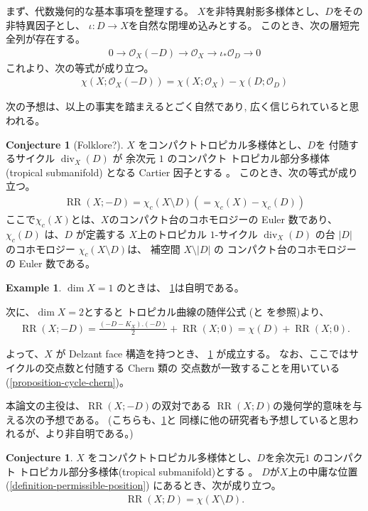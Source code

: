 \documentclass[a4paper,dvipdfmx,reqno,12pt]{amsart}
\theoremstyle{definition}
\newtheorem{example}[theorem]{Example}
\newtheorem{conjecture}[theorem]{Conjecture}
\newcommand{\opn}[1]{\operatorname{#1}}
\numberwithin{equation}{section}
\begin{document}
まず、代数幾何的な基本事項を整理する。
$X$を非特異射影多様体とし、$D$をその非特異因子とし、
$\iota\colon D\to X$を自然な閉埋め込みとする。
このとき、次の層短完全列が存在する。
\begin{align}
     0\to \mathcal{O}_X(-D)\to 
\mathcal{O}_X\to \iota_*\mathcal{O}_D\to 0
\end{align}
これより、次の等式が成り立つ。
\begin{align}
\label{equation-anti-effective-divisor}
\chi(X;\mathcal{O}_X(-D))=\chi(X;\mathcal{O}_X)
-\chi(D;\mathcal{O}_D)
\end{align}

次の予想は、以上の事実を踏まえるとごく自然であり,
広く信じられていると思われる。

\begin{conjecture}[{Folklore?}]
\label{conjecture-rr-c-euler}
$X$ をコンパクトトロピカル多様体とし、$D$を
付随するサイクル $\opn{div}_X(D)$ が
余次元 $1$
のコンパクト
トロピカル部分多様体(tropical submanifold)
となる Cartier 因子とする
\cite[Definition 2.14]{demedrano2023chern}。
このとき、次の等式が成り立つ。
\begin{align}
\opn{RR}(X;-D)=
\chi_c (X\setminus D) (=\chi_c (X)-\chi_c(D))
\end{align}
ここで$\chi_c(X)$とは、$X$のコンパクト台のコホモロジーの
Euler 数であり、
$\chi_c(D)$ は、$D$ が定義する
$X$上のトロピカル $1$-サイクル $\opn{div}_X(D)$
の台 $|D|$ のコホモロジー
$\chi_c(X\setminus D)$は、
補空間 $X\setminus |D|$ の コンパクト台のコホモロジーの
Euler 数である。
\end{conjecture}

\begin{example}
$\dim X=1$ のときは、
\cref{conjecture-rr-c-euler}は自明である。

次に、$\dim X=2$とすると
トロピカル曲線の随伴公式
(\cite[Theorem 6]{shaw2015tropical}と
\cite[Theorem 5.2]{demedrano2023chern}を参照)より、
\begin{align}
\opn{RR}(X;-D)=\frac{(-D-K_X).(-D)}{2}+\opn{RR}(X;0)
=\chi(D)+\opn{RR}(X;0).
\end{align}

よって、$X$ が Delzant face 構造を持つとき、
\cref{conjecture-rr-c-euler} が成立する。
なお、ここではサイクルの交点数と付随する Chern 類の
交点数が一致することを用いている
(\cref{proposition-cycle-chern})。
\end{example}
本論文の主役は、$\opn{RR}(X;-D)$の双対である
$\opn{RR}(X;D)$の幾何学的意味を与える次の予想である。
(こちらも、\cref{conjecture-rr-c-euler}と
同様に他の研究者も予想していると思われるが、より非自明である。)
\begin{conjecture}
\label{conjecture-rr-euler}
$X$ をコンパクトトロピカル多様体とし、$D$を余次元$1$
のコンパクト
トロピカル部分多様体(tropical submanifold)とする
\cite[Definition 2.14]{demedrano2023chern}。
$D$が$X$上の中庸な位置
(\cref{definition-permissible-position})
にあるとき、次が成り立つ。
\begin{align}
\opn{RR}(X;D)=\chi(X\setminus D).
\end{align}
\end{conjecture}
\end{document}
